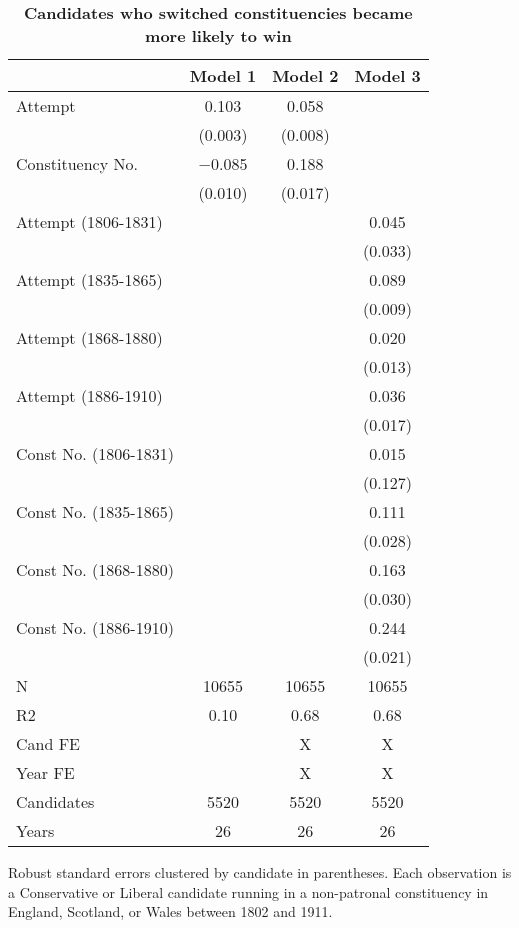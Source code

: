 \begin{table}

\caption{\textbf{Candidates who switched constituencies became more likely to win}}
\centering
\begin{threeparttable}
\begin{tabular}[t]{lccc}
\toprule
  & Model 1 & Model 2 & Model 3\\
\midrule
Attempt & \num{0.103} & \num{0.058} & \\
 & (\num{0.003}) & (\num{0.008}) & \\
Constituency No. & \num{-0.085} & \num{0.188} & \\
 & (\num{0.010}) & (\num{0.017}) & \\
Attempt (1806-1831) &  &  & \num{0.045}\\
 &  &  & (\num{0.033})\\
Attempt (1835-1865) &  &  & \num{0.089}\\
 &  &  & (\num{0.009})\\
Attempt (1868-1880) &  &  & \num{0.020}\\
 &  &  & (\num{0.013})\\
Attempt (1886-1910) &  &  & \num{0.036}\\
 &  &  & (\num{0.017})\\
Const No. (1806-1831) &  &  & \num{0.015}\\
 &  &  & (\num{0.127})\\
Const No. (1835-1865) &  &  & \num{0.111}\\
 &  &  & (\num{0.028})\\
Const No. (1868-1880) &  &  & \num{0.163}\\
 &  &  & (\num{0.030})\\
Const No. (1886-1910) &  &  & \num{0.244}\\
 &  &  & (\num{0.021})\\
\midrule
N & \num{10655} & \num{10655} & \num{10655}\\
R2 & \num{0.10} & \num{0.68} & \num{0.68}\\
Cand FE &  & X & X\\
Year FE &  & X & X\\
Candidates & 5520 & 5520 & 5520\\
Years & 26 & 26 & 26\\
\bottomrule
\end{tabular}
\begin{tablenotes}[para]
\small
\item Robust standard errors clustered by candidate in parentheses. Each observation is a Conservative or Liberal candidate running in a non-patronal constituency in England, Scotland, or Wales between 1802 and 1911.
\end{tablenotes}
\end{threeparttable}
\end{table}